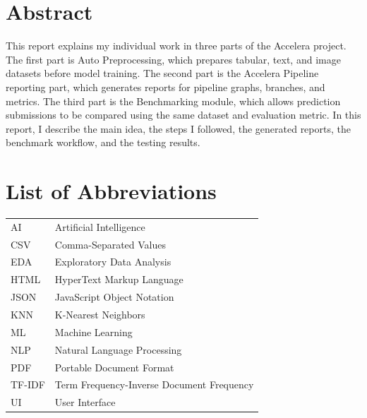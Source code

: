 \documentclass[12pt,a4paper,oneside]{report}
\begin{document}
\setcounter{page}{2}

\chapter*{Abstract}
This report explains my individual work in three parts of the Accelera
project. The first part is Auto Preprocessing, which prepares tabular, text,
and image datasets before model training. The second part is the Accelera
Pipeline reporting part, which generates reports for pipeline graphs, branches,
and metrics. The third part is the Benchmarking module, which allows prediction
submissions to be compared using the same dataset and evaluation metric.
In this report, I describe the main idea, the steps I
followed, the generated reports, the benchmark workflow, and the testing
results.

\clearpage

\clearpage
{}
{}
\tableofcontents

\clearpage
{}
{}
\listoffigures

\clearpage
{}
{}
\listoftables

\clearpage
{}
{}
\lstlistoflistings

\clearpage

\chapter*{List of Abbreviations}
\begin{tabular}{ll}
AI & Artificial Intelligence \\
CSV & Comma-Separated Values \\
EDA & Exploratory Data Analysis \\
HTML & HyperText Markup Language \\
JSON & JavaScript Object Notation \\
KNN & K-Nearest Neighbors \\
ML & Machine Learning \\
NLP & Natural Language Processing \\
PDF & Portable Document Format \\
TF-IDF & Term Frequency-Inverse Document Frequency \\
UI & User Interface \\
\end{tabular}
\end{document}
